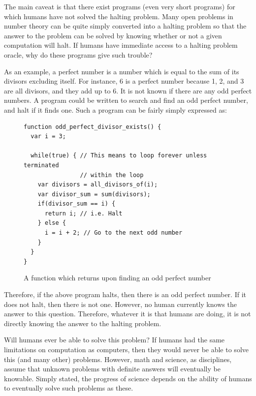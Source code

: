 The main caveat is that there exist programs (even very short programs) for which humans have not solved the halting problem.  Many open problems in number theory can be quite simply converted into a halting problem so that the answer to the problem can be solved by knowing whether or not a given computation will halt.  If humans have immediate access to a halting problem oracle, why do these programs give such trouble?

As an example, a perfect number is a number which is equal to the sum of its divisors excluding itself.  For instance, 6 is a perfect number because 1, 2, and 3 are all divisors, and they add up to 6.  It is not known if there are any odd perfect numbers.  A program could be written to search and find an odd perfect number, and halt if it finds one.  Such a program can be fairly simply expressed as:

\begin{figure}[H]
\begin{mdframed}
\begin{verbatim}
function odd_perfect_divisor_exists() {
  var i = 3;

  while(true) { // This means to loop forever unless terminated 
                // within the loop
    var divisors = all_divisors_of(i);
    var divisor_sum = sum(divisors);
    if(divisor_sum == i) {
      return i; // i.e. Halt
    } else {
      i = i + 2; // Go to the next odd number
    }
  }
}
\end{verbatim}
\end{mdframed}
\caption{A function which returns upon finding an odd perfect number}
\end{figure}

Therefore, if the above program halts, then there is an odd perfect number.  If it does not halt, then there is not one.  However, no human currently knows the answer to this question.  Therefore, whatever it is that humans are doing, it is not directly knowing the answer to the halting problem.

Will humans ever be able to solve this problem?  If humans had the same limitations on computation as computers, then they would never be able to solve this (and many other) problems.  However, math and science, as disciplines, assume that unknown problems with definite answers will eventually be knowable.  Simply stated, the progress of science depends on the ability of humans to eventually solve such problems as these.

